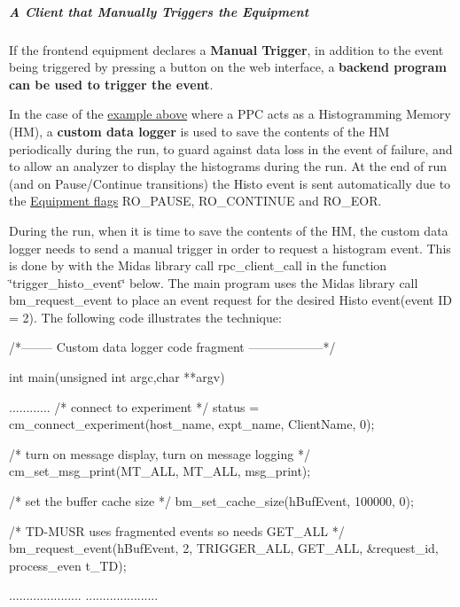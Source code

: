 \label{FE_eq_event_routines_idx_event_manual-trigger_client}
\hypertarget{FE_eq_event_routines_idx_event_manual-trigger_client}{}
 \hypertarget{FE_eq_event_routines_FE_backend_Manual_Trigger}{}\subparagraph{A Client that Manually Triggers the Equipment}\label{FE_eq_event_routines_FE_backend_Manual_Trigger}
If the frontend equipment declares a {\bfseries Manual Trigger}, in addition to the event being triggered by pressing a button on the web interface, a {\bfseries backend program can be used to trigger the event}. \par
 In the case of the \hyperlink{FE_eq_event_routines_FE_manual_trigger}{example above} where a PPC acts as a Histogramming Memory (HM), a {\bfseries  custom data logger } is used to save the contents of the HM periodically during the run, to guard against data loss in the event of failure, and to allow an analyzer to display the histograms during the run. At the end of run (and on Pause/Continue transitions) the Histo event is sent automatically due to the \hyperlink{FE_eq_event_routines_FE_tdmusr_equipment}{Equipment flags} RO\_\-PAUSE, RO\_\-CONTINUE and RO\_\-EOR. \par
 During the run, when it is time to save the contents of the HM, the custom data logger needs to send a manual trigger in order to request a histogram event. This is done by with the Midas library call rpc\_\-client\_\-call in the function \char`\"{}trigger\_\-histo\_\-event\char`\"{} below. The main program uses the Midas library call bm\_\-request\_\-event to place an event request for the desired Histo event(event ID = 2). The following code illustrates the technique:


\begin{DoxyCode}
/*-------- Custom data logger code fragment  ------------------*/

int main(unsigned int argc,char **argv)
{

   ............
   /* connect to experiment */
   status = cm_connect_experiment(host_name, expt_name, ClientName, 0);

   /* turn on message display, turn on message logging */
    cm_set_msg_print(MT_ALL, MT_ALL, msg_print);

 
   /* set the buffer cache size */
    bm_set_cache_size(hBufEvent, 100000, 0);

   /* TD-MUSR uses fragmented events so needs GET_ALL  */
   bm_request_event(hBufEvent, 2, TRIGGER_ALL, GET_ALL, &request_id, process_even
      t_TD);

   .....................
   .....................
}
\end{DoxyCode}


